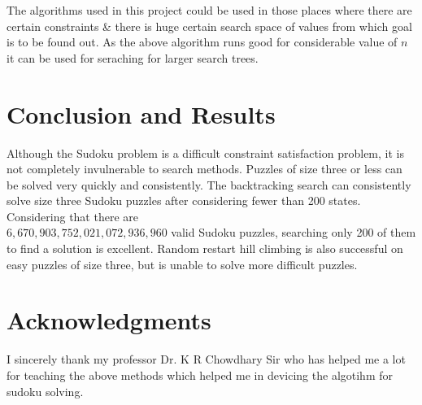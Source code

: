 \documentclass[fleqn,10pt]{SelfArx}
\newlength{\tocsep}
\begin{document}
The algorithms used in this project could be used in those places where there are certain constraints \& there is huge certain search space of values from which goal is to be found out. As the above algorithm runs good for considerable value of 
$n$ it can be used for seraching for larger search trees.

\section{Conclusion and Results}

Although the Sudoku problem is a difficult constraint satisfaction problem, it is not
completely invulnerable to search methods. Puzzles of size three or less can be solved very quickly
and consistently. The backtracking search can consistently solve size three Sudoku puzzles after
considering fewer than 200 states. Considering that there are \\$6,670,903,752,021,072,936,960$ valid
Sudoku puzzles, searching only 200 of them to find a solution is excellent. Random restart hill
climbing is also successful on easy puzzles of size three, but is unable to solve more difficult
puzzles.


\section*{Acknowledgments} %


I sincerely thank my professor Dr. K R Chowdhary Sir who has helped me a lot for teaching the above methods which helped me in devicing the algotihm for sudoku solving.

\cite{Figueredo:2009dg}\cite{NewBook}



\end{document}
